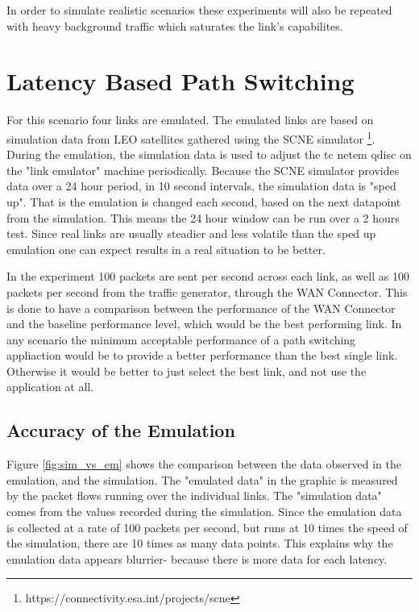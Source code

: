 In order to simulate realistic scenarios these experiments will also be repeated with heavy background traffic which saturates the link's capabilites.


\section{Latency Based Path Switching}

For this scenario four links are emulated. The emulated links are based on simulation data from LEO satellites gathered using the SCNE simulator \footnote{https://connectivity.esa.int/projects/scne}. During the emulation, the simulation data is used to adjust the tc netem qdisc on the "link emulator" machine periodically. Because the SCNE simulator provides data over a 24 hour period, in 10 second intervals, the simulation data is "sped up". That is the emulation is changed each second, based on the next datapoint from the simulation. This means the 24 hour window can be run over a 2 hours test. Since real links are usually steadier and less volatile than the sped up emulation one can expect results in a real situation to be better.

In the experiment 100 packets are sent per second across each link, as well as 100 packets per second from the traffic generator, through the WAN Connector. This is done to have a comparison between the performance of the WAN Connector and the baseline performance level, which would be the best performing link. In any scenario the minimum acceptable performance of a path switching appliaction would be to provide a better performance than the best single link. Otherwise it would be better to just select the best link, and not use the application at all.

\subsection{Accuracy of the Emulation}

Figure \ref{fig:sim_vs_em} shows the comparison between the data observed in the emulation, and the simulation. The "emulated data" in the graphic is measured by the packet flows running over the individual links. The "simulation data" comes from the values recorded during the simulation. Since the emulation data is collected at a rate of 100 packets per second, but runs at 10 times the speed of the simulation, there are 10 times as many data points. This explains why the emulation data appears blurrier- because there is more data for each latency.

